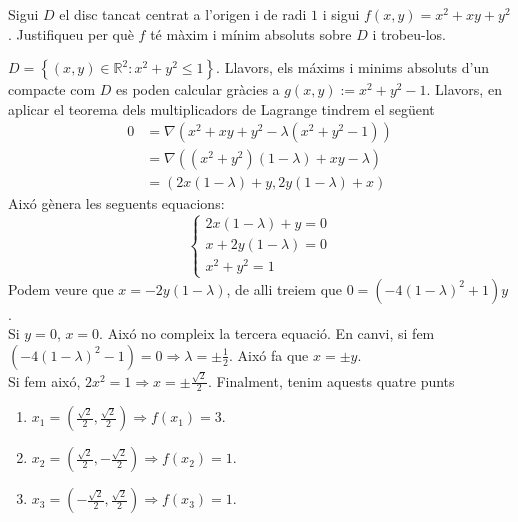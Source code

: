 \documentclass[a4paper, 12pt]{article}
\begin{document}
    \setcounter{numex}{58}
    \begin{exercici}
        Sigui $D$ el disc tancat centrat a l'origen i de radi $1$ i sigui $f\left(x,y\right) = x^2+xy+y^2$.
        Justifiqueu per què $f$ té màxim i mínim absoluts sobre $D$ i trobeu-los.
    \end{exercici}
    \begin{solucio}
        $D = \left\{\left(x,y\right)\in\mathbb{R}^2: x^2+y^2 \leq 1\right\}$. Llavors, els máxims i
        minims absoluts d'un compacte com $D$ es poden calcular gràcies a $g(x,y) := x^2+y^2-1$.
        Llavors, en aplicar el teorema dels multiplicadors de Lagrange tindrem el següent
        \begin{displaymath}
            \begin{split}
                0 &= \nabla\left(x^2+xy+y^2 - \lambda \left(x^2+y^2-1\right)\right)\\
                &= \nabla\left((x^2+y^2)(1-\lambda)+xy-\lambda\right)\\
                &= \left(2x(1-\lambda)+y, 2y(1-\lambda)+x\right)
            \end{split}
        \end{displaymath}
        Aixó gènera les seguents equacions:
        \begin{displaymath}
            \begin{cases}
                2x(1-\lambda)+y = 0\\
                x+2y(1-\lambda) = 0\\
                x^2+y^2 = 1
            \end{cases}
        \end{displaymath}
        Podem veure que $x = -2y(1-\lambda)$, de alli treiem que $0 = (-4(1-\lambda)^2+1)y$.\\
        Si $y = 0$, $x = 0$. Aixó no compleix la tercera equació. En canvi, si fem $(-4(1-\lambda)^2-1) = 0 \Rightarrow \lambda = \pm \frac{1}{2}$.
        Aixó fa que $x = \pm y$.\\
        Si fem aixó, $2x^2 = 1 \Rightarrow x = \pm\frac{\sqrt{2}}{2}$. Finalment, tenim aquests
        quatre punts
        \begin{enumerate}
            \item $x_1 = \left(\frac{\sqrt{2}}{2}, \frac{\sqrt{2}}{2}\right) \Rightarrow f(x_1) = 3.$
            \item $x_2 = \left(\frac{\sqrt{2}}{2}, -\frac{\sqrt{2}}{2}\right) \Rightarrow f(x_2) = 1.$
            \item $x_3 = \left(-\frac{\sqrt{2}}{2}, \frac{\sqrt{2}}{2}\right) \Rightarrow f(x_3) = 1.$

\end{enumerate}
\end{solucio}
\end{document}
